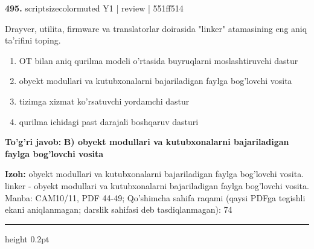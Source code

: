\documentclass[10pt,a4paper]{article}
\begin{document}
{\bfseries\sffamily\color{ink} 495.} {scriptsizecolor{muted} Y1 | review | 551ff514}
\par
Drayver, utilita, firmware va translatorlar doirasida "linker" atamasining eng aniq ta'rifini toping.
\begin{enumerate}[label=\Alph*),leftmargin=9mm]
\item OT bilan aniq qurilma modeli o'rtasida buyruqlarni moslashtiruvchi dastur
\item obyekt modullari va kutubxonalarni bajariladigan faylga bog'lovchi vosita
\item tizimga xizmat ko'rsatuvchi yordamchi dastur
\item qurilma ichidagi past darajali boshqaruv dasturi
\end{enumerate}
\begin{tcolorbox}[enhanced,breakable,colback=teal!4,colframe=teal!60!black,boxrule=0.45pt,arc=1.2mm,left=2.7mm,right=2.7mm,top=1.8mm,bottom=1.8mm,before skip=2mm,after skip=2mm]
{\bfseries\sffamily\color{teal}To'g'ri javob:} \textbf{B) obyekt modullari va kutubxonalarni bajariladigan faylga bog'lovchi vosita}
\par\smallskip
{\bfseries Izoh:} obyekt modullari va kutubxonalarni bajariladigan faylga bog'lovchi vosita. linker - obyekt modullari va kutubxonalarni bajariladigan faylga bog'lovchi vosita. Manba: CAM10/11, PDF 44-49; Qo'shimcha sahifa raqami (qaysi PDFga tegishli ekani aniqlanmagan; darslik sahifasi deb tasdiqlanmagan): 74
\end{tcolorbox}
\vspace{2mm}\hrule height 0.2pt\vspace{3mm}
\end{document}
